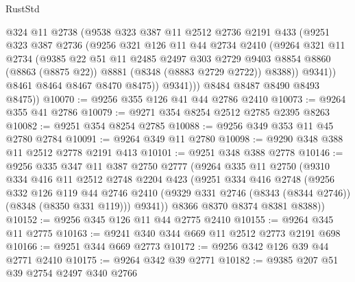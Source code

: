 \begin{lexlean}{RustStd}
\begin{coremodule}
{\begin{coremodule}
{{{{{{{{{{{{{{{{{{{{{{{{{{{{{{{{{{{{{{{{{{{{{{{{{{                @324
                @11
                @2738
                (@9538
                  @323
                  @387
                  @11
                  @2512
                  @2736
                  @2191
                  @433
                  (@9251
                    @323
                    @387
                    @2736
                    (@9256
                      @321
                      @126
                      @11
                      @44
                      @2734
                      @2410
                      (@9264
                        @321
                        @11
                        @2734
                        (@9385
                          @22
                          @51
                          @11
                          @2485
                          @2497
                          @303
                          @2729
                          @9403
                          @8854
                          @8860
                          (@8863 (@8875 @22))
                          @8881
                          (@8348 (@8883 @2729 @2722))
                          @8388))
                      @9341))
                  @8461
                  @8464
                  @8467
                  @8470
                  @8475))
              @9341)))
        @8484
        @8487
        @8490
        @8493
        @8475))
@10070 := @9256 @355 @126 @41 @44 @2786 @2410
@10073 := @9264 @355 @41 @2786
@10079 := @9271 @354 @8254 @2512 @2785 @2395 @8263
@10082 := @9251 @354 @8254 @2785
@10088 := @9256 @349 @353 @11 @45 @2780 @2784
@10091 := @9264 @349 @11 @2780
@10098 := @9290 @348 @388 @11 @2512 @2778 @2191 @413
@10101 := @9251 @348 @388 @2778
@10146 := @9256
    @335
    @347
    @11
    @387
    @2750
    @2777
    (@9264
      @335
      @11
      @2750
      (@9310
        @334
        @416
        @11
        @2512
        @2748
        @2204
        @423
        (@9251
          @334
          @416
          @2748
          (@9256
            @332
            @126
            @119
            @44
            @2746
            @2410
            (@9329 @331 @2746 (@8343 (@8344 @2746)) (@8348 (@8350 @331 @119)))
            @9341))
        @8366
        @8370
        @8374
        @8381
        @8388))
@10152 := @9256 @345 @126 @11 @44 @2775 @2410
@10155 := @9264 @345 @11 @2775
@10163 := @9241 @340 @344 @669 @11 @2512 @2773 @2191 @698
@10166 := @9251 @344 @669 @2773
@10172 := @9256 @342 @126 @39 @44 @2771 @2410
@10175 := @9264 @342 @39 @2771
@10182 := @9385 @207 @51 @39 @2754 @2497 @340 @2766
}}}}}}}}}}}}}}}}}}}}}}}}}}}}}}}}}}}}}}}}}}}}}}}}}}
\end{coremodule}}
\end{coremodule}
\end{lexlean}
